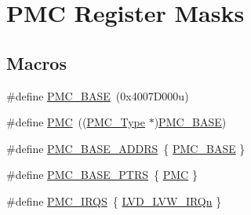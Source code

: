 \hypertarget{group___p_m_c___register___masks}{}\section{P\+MC Register Masks}
\label{group___p_m_c___register___masks}
\subsection*{Macros}
\begin{DoxyCompactItemize}
\item 
\#define \mbox{\hyperlink{group___p_m_c___register___masks_ga4e92bd47dc68cc81e62c344586a4cdfa}{P\+M\+C\+\_\+\+B\+A\+SE}}~(0x4007\+D000u)
\item 
\#define \mbox{\hyperlink{group___p_m_c___register___masks_ga979c6d379c67bc2f3e8eb6efcb509f69}{P\+MC}}~((\mbox{\hyperlink{struct_p_m_c___type}{P\+M\+C\+\_\+\+Type}} $\ast$)\mbox{\hyperlink{group___p_m_c___register___masks_ga4e92bd47dc68cc81e62c344586a4cdfa}{P\+M\+C\+\_\+\+B\+A\+SE}})
\item 
\#define \mbox{\hyperlink{group___p_m_c___register___masks_gab8cb010a2427fcd279c99d0bd4eb809f}{P\+M\+C\+\_\+\+B\+A\+S\+E\+\_\+\+A\+D\+D\+RS}}~\{ \mbox{\hyperlink{group___p_m_c___register___masks_ga4e92bd47dc68cc81e62c344586a4cdfa}{P\+M\+C\+\_\+\+B\+A\+SE}} \}
\item 
\#define \mbox{\hyperlink{group___p_m_c___register___masks_ga4bcd62643d597f7230f9c1e3d03caaa7}{P\+M\+C\+\_\+\+B\+A\+S\+E\+\_\+\+P\+T\+RS}}~\{ \mbox{\hyperlink{group___p_m_c___register___masks_ga979c6d379c67bc2f3e8eb6efcb509f69}{P\+MC}} \}
\item 
\#define \mbox{\hyperlink{group___p_m_c___register___masks_ga55eb026c8e8941e1e4d009d8563784b0}{P\+M\+C\+\_\+\+I\+R\+QS}}~\{ \mbox{\hyperlink{group___interrupt__vector__numbers_gga666eb0caeb12ec0e281415592ae89083aa4897ad7f6f60bb37f339af7cc9c4477}{L\+V\+D\+\_\+\+L\+V\+W\+\_\+\+I\+R\+Qn}} \}
\end{DoxyCompactItemize}
